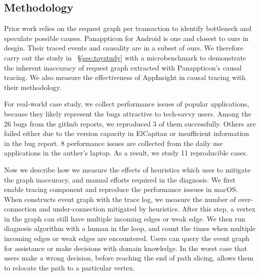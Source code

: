 \subsection{Methodology} \label{sec:methodology}


Prior work relies on the request graph per transaction to identify bottleneck
and speculate possible causes. Panappticon for Android is one and closest to
ours in desgin. Their traced events and causality are in a subset of ours.  We
therefore carry out the study in ~\S\ref{sec:toystudy} with a microbenchmark to
demonstrate the inherent inaccuracy of request graph extracted with
Panappticon's causal tracing. We also measure the effectiveness of AppInsight
in causal tracing with their methodology.

For real-world case study, we collect performance issues of popular
applications, because they likely represent the bugs attractive to tech-savvy
users. Among the 26 bugs from the github reports, we reproduced 3 of them
successfully. Others are failed either due to the version capacity in ElCapitan
or insufficient information in the bug report. 8 performance issues are
collected from the daily use applications in the auther's laptop. As a result,
we study 11 reproducible cases. 


Now we describe how we measure the effects of heuristics which \xxx uses to
mitigate the graph inaccuracy, and manual efforts required in the diagnosis. We
first enable tracing component and reproduce the performance isssues in macOS.
When \xxx constructs event graph with the trace log, we measure the number of
over-connection and under-connection mitigated by heuristics. After this step, a
vertex in the graph can still have multiple incoming edges or weak edge. We then
run \xxx diagnosis algorithm with a human in the loop, and count the times when
multiple incoming edges or weak edges are encountered. Users can query the event
graph for assistance or make decisions with domain knowledge. In the worst case
that users make a wrong decision, before reaching the end of path slicing, \xxx
allows them to relocate the path to a particular vertex.

